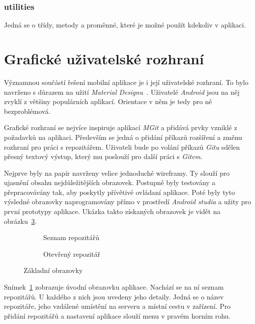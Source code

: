     \subsubsection{utilities}
    Jedná se o třídy, metody a proměnné, které je možné použít kdekoliv v aplikaci.

\newpage
\section{Grafické uživatelské rozhraní}
Významnou součástí řešení mobilní aplikace je i její uživatelské rozhraní. To bylo navrženo s důrazem na užití \emph{Material Designu}~. Uživatelé \emph{Android} jsou na něj zvyklí z většiny populárních aplikací. Orientace v něm je tedy pro ně bezproblémová.

Grafické rozhraní se nejvíce inspiruje aplikací \emph{MGit} a přidává prvky vzniklé z požadavků na aplikaci. Především se jedná o přidání příkazů rozšíření a změnu rozhraní pro práci s repozitářem. Uživateli bude po volání příkazů \emph{Gitu} sdělen přesný textový výstup, který mu poslouží pro další práci s \emph{Gitem}. 

Nejprve byly na papír navrženy velice jednoduché wireframy. Ty slouží pro ujasnění obsahu nejdůležitějších obrazovek. Postupně byly testovány a přepracovávány tak, aby poskytly přívětivé ovládaní aplikace. Poté byly tyto výsledné obrazovky naprogramovány přímo v prostředí \emph{Android studia} a užity pro první prototypy aplikace. Ukázka takto získaných obrazovek je vidět na obrázku~\ref{fig:obrazovky}.

\begin{figure}[ht]
    \vspace{0.5cm}
    \centering
    \begin{subfigure}{.4\textwidth}        
        \centering
        \caption{Seznam repozitářů}\label{fig:orig}
        \label{fig:repolist_frame}
    \end{subfigure}
    \begin{subfigure}{.4\textwidth}
        \centering
        \caption{Otevřený repozitář}
        \label{fig:result_frame}
    \end{subfigure}
\caption{Základní obrazovky}%
\label{fig:obrazovky}%
\end{figure}

Snímek~\ref{fig:repolist_frame} zobrazuje úvodní obrazovku aplikace. Nachází se na ní seznam repozitářů. U každého z nich jsou uvedeny jeho detaily. Jedná se o název repozitáře, jeho vzdálené umístění na serveru a místní cestu v zařízení. Pro přidání repozitářů a nastavení aplikace slouží menu v pravém horním rohu. 

